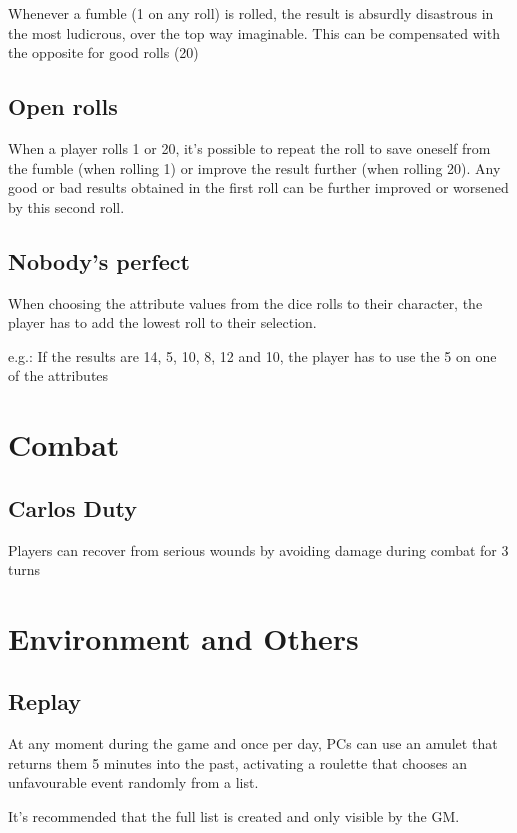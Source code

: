 Whenever a fumble (1 on any roll) is rolled, the result is absurdly disastrous in the most ludicrous, over the top way imaginable. This can be compensated with the opposite for good rolls (20)

\subsection*{Open rolls}

When a player rolls 1 or 20, it's possible to repeat the roll to save oneself from the fumble (when rolling 1) or improve the result further (when rolling 20). Any good or bad results obtained in the first roll can be further improved or worsened by this second roll.

\subsection*{Nobody's perfect}

When choosing the attribute values from the dice rolls to their character, the player has to add the lowest roll to their selection. 
\par
e.g.: If the results are 14, 5, 10, 8, 12 and 10, the player has to use the 5 on one of the attributes

\section{Combat}

\subsection*{Carlos Duty}

Players can recover from serious wounds by avoiding damage during combat for 3 turns

\section{Environment and Others}

\subsection*{Replay}

At any moment during the game and once per day, PCs can use an amulet that returns them 5 minutes into the past, activating a roulette that chooses an unfavourable event randomly from a list.
\par
It's recommended that the full list is created and only visible by the GM.

